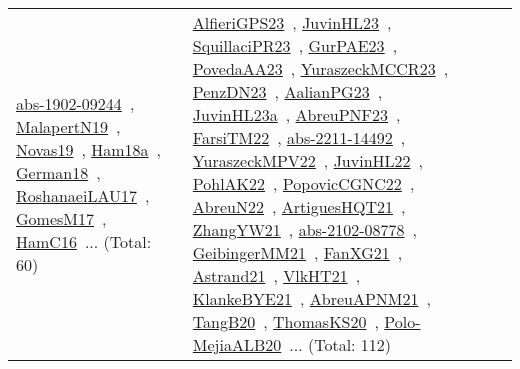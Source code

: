 {\begin{longtable}{lp{3cm}>{\raggedright\arraybackslash}p{6cm}>{\raggedright\arraybackslash}p{6cm}>{\raggedright\arraybackslash}p{8cm}}
\href{works/abs-1902-09244.pdf}{abs-1902-09244}~\cite{abs-1902-09244}, \href{works/MalapertN19.pdf}{MalapertN19}~\cite{MalapertN19}, \href{works/Novas19.pdf}{Novas19}~\cite{Novas19}, \href{works/Ham18a.pdf}{Ham18a}~\cite{Ham18a}, \href{works/German18.pdf}{German18}~\cite{German18}, \href{works/RoshanaeiLAU17.pdf}{RoshanaeiLAU17}~\cite{RoshanaeiLAU17}, \href{works/GomesM17.pdf}{GomesM17}~\cite{GomesM17}, \href{works/HamC16.pdf}{HamC16}~\cite{HamC16}... (Total: 60) & \href{works/AlfieriGPS23.pdf}{AlfieriGPS23}~\cite{AlfieriGPS23}, \href{works/JuvinHL23.pdf}{JuvinHL23}~\cite{JuvinHL23}, \href{works/SquillaciPR23.pdf}{SquillaciPR23}~\cite{SquillaciPR23}, \href{works/GurPAE23.pdf}{GurPAE23}~\cite{GurPAE23}, \href{works/PovedaAA23.pdf}{PovedaAA23}~\cite{PovedaAA23}, \href{works/YuraszeckMCCR23.pdf}{YuraszeckMCCR23}~\cite{YuraszeckMCCR23}, \href{works/PenzDN23.pdf}{PenzDN23}~\cite{PenzDN23}, \href{works/AalianPG23.pdf}{AalianPG23}~\cite{AalianPG23}, \href{works/JuvinHL23a.pdf}{JuvinHL23a}~\cite{JuvinHL23a}, \href{works/AbreuPNF23.pdf}{AbreuPNF23}~\cite{AbreuPNF23}, \href{works/FarsiTM22.pdf}{FarsiTM22}~\cite{FarsiTM22}, \href{works/abs-2211-14492.pdf}{abs-2211-14492}~\cite{abs-2211-14492}, \href{works/YuraszeckMPV22.pdf}{YuraszeckMPV22}~\cite{YuraszeckMPV22}, \href{works/JuvinHL22.pdf}{JuvinHL22}~\cite{JuvinHL22}, \href{works/PohlAK22.pdf}{PohlAK22}~\cite{PohlAK22}, \href{works/PopovicCGNC22.pdf}{PopovicCGNC22}~\cite{PopovicCGNC22}, \href{works/AbreuN22.pdf}{AbreuN22}~\cite{AbreuN22}, \href{works/ArtiguesHQT21.pdf}{ArtiguesHQT21}~\cite{ArtiguesHQT21}, \href{works/ZhangYW21.pdf}{ZhangYW21}~\cite{ZhangYW21}, \href{works/abs-2102-08778.pdf}{abs-2102-08778}~\cite{abs-2102-08778}, \href{works/GeibingerMM21.pdf}{GeibingerMM21}~\cite{GeibingerMM21}, \href{works/FanXG21.pdf}{FanXG21}~\cite{FanXG21}, \href{works/Astrand21.pdf}{Astrand21}~\cite{Astrand21}, \href{works/VlkHT21.pdf}{VlkHT21}~\cite{VlkHT21}, \href{works/KlankeBYE21.pdf}{KlankeBYE21}~\cite{KlankeBYE21}, \href{works/AbreuAPNM21.pdf}{AbreuAPNM21}~\cite{AbreuAPNM21}, \href{works/TangB20.pdf}{TangB20}~\cite{TangB20}, \href{works/ThomasKS20.pdf}{ThomasKS20}~\cite{ThomasKS20}, \href{works/Polo-MejiaALB20.pdf}{Polo-MejiaALB20}~\cite{Polo-MejiaALB20}... (Total: 112)\\

\end{longtable}}
